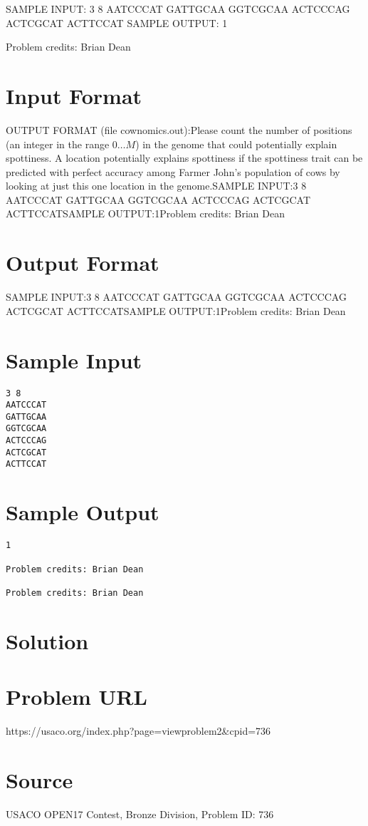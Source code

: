 \documentclass[12pt]{article}
\begin{document}
SAMPLE INPUT:
3 8
AATCCCAT
GATTGCAA
GGTCGCAA
ACTCCCAG
ACTCGCAT
ACTTCCAT
SAMPLE OUTPUT: 
1


Problem credits: Brian Dean



\section*{Input Format}
OUTPUT FORMAT (file cownomics.out):Please count the number of positions (an integer in the range $0 \ldots M$) in
the genome that could potentially explain spottiness.  A location potentially
explains spottiness if the spottiness trait can be predicted with perfect
accuracy among Farmer John's population of cows by looking at just this one
location in the genome.SAMPLE INPUT:3 8
AATCCCAT
GATTGCAA
GGTCGCAA
ACTCCCAG
ACTCGCAT
ACTTCCATSAMPLE OUTPUT:1Problem credits: Brian Dean

\section*{Output Format}
SAMPLE INPUT:3 8
AATCCCAT
GATTGCAA
GGTCGCAA
ACTCCCAG
ACTCGCAT
ACTTCCATSAMPLE OUTPUT:1Problem credits: Brian Dean

\section*{Sample Input}
\begin{verbatim}
3 8
AATCCCAT
GATTGCAA
GGTCGCAA
ACTCCCAG
ACTCGCAT
ACTTCCAT
\end{verbatim}

\section*{Sample Output}
\begin{verbatim}
1

Problem credits: Brian Dean

Problem credits: Brian Dean
\end{verbatim}

\section*{Solution}


\section*{Problem URL}
https://usaco.org/index.php?page=viewproblem2&cpid=736

\section*{Source}
USACO OPEN17 Contest, Bronze Division, Problem ID: 736
\end{document}
